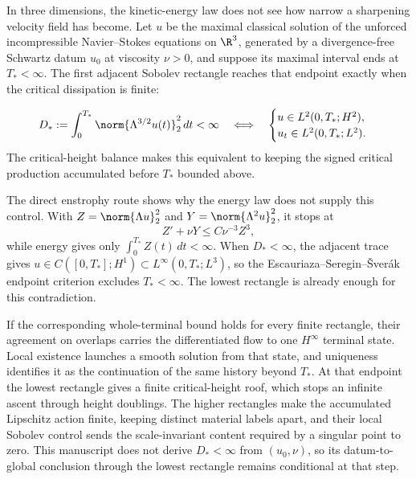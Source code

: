 
In three dimensions, the kinetic-energy law does not see how narrow a
sharpening velocity field has become.  Let \(u\) be the maximal classical
solution of the unforced incompressible Navier--Stokes equations on \(\R^3\),
generated by a divergence-free Schwartz datum \(u_0\) at viscosity \(\nu>0\),
and suppose its maximal interval ends at \(T_*<\infty\).  The first adjacent
Sobolev rectangle reaches that endpoint exactly when the critical dissipation
is finite:

\[
  D_*:=\int_0^{T_*}\norm{\Lambda^{3/2}u(t)}_2^2\,dt<\infty
  \quad\Longleftrightarrow\quad
  \begin{cases}
    u\in L^2(0,T_*;H^2),\\
    u_t\in L^2(0,T_*;L^2).
  \end{cases}
\]
The critical-height balance makes this equivalent to keeping the signed
critical production accumulated before \(T_*\) bounded above.

The direct enstrophy route shows why the energy law does not supply this
control.  With \(Z=\norm{\Lambda u}_2^2\) and
\(Y=\norm{\Lambda^2u}_2^2\), it stops at
\[
  Z'+\nu Y\leq C\nu^{-3}Z^3,
\]
while energy gives only \(\int_0^{T_*}Z(t)\,dt<\infty\).  When
\(D_*<\infty\), the adjacent trace gives
\(u\in C([0,T_*];H^1)\subset L^\infty(0,T_*;L^3)\), so the
Escauriaza--Seregin--\v{S}ver\'ak endpoint criterion excludes
\(T_*<\infty\).  The lowest rectangle is already enough for this
contradiction.

If the corresponding whole-terminal bound holds for every finite rectangle,
their agreement on overlaps carries the differentiated flow to one
\(H^\infty\) terminal state.  Local existence launches a smooth solution from
that state, and uniqueness identifies it as the continuation of the same
history beyond \(T_*\).  At that endpoint the lowest rectangle gives a finite
critical-height roof, which stops an infinite ascent through height doublings.
The higher rectangles make the accumulated Lipschitz action finite, keeping
distinct material labels apart, and their local Sobolev control sends the
scale-invariant content required by a singular point to zero.  This manuscript
does not derive \(D_*<\infty\) from \((u_0,\nu)\), so its datum-to-global
conclusion through the lowest rectangle remains conditional at that step.
